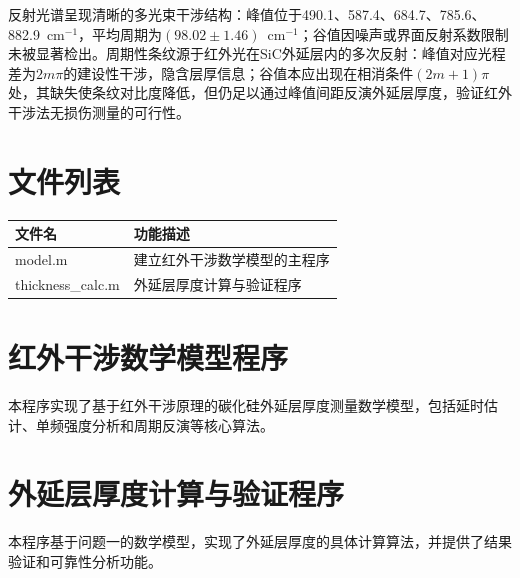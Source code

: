 \documentclass[withoutpreface,bwprint]{cumcmthesis}
\begin{document}
反射光谱呈现清晰的多光束干涉结构：峰值位于490.1、587.4、684.7、785.6、882.9~cm$^{-1}$，平均周期为$(98.02\pm 1.46)$~cm$^{-1}$；谷值因噪声或界面反射系数限制未被显著检出。周期性条纹源于红外光在SiC外延层内的多次反射：峰值对应光程差为$2m\pi$的建设性干涉，隐含层厚信息；谷值本应出现在相消条件$(2m+1)\pi$处，其缺失使条纹对比度降低，但仍足以通过峰值间距反演外延层厚度，验证红外干涉法无损伤测量的可行性。

\nocite{*}

\newpage
\begin{appendices}
\section{文件列表}
\begin{table}[H]
\centering
\begin{tabularx}{\textwidth}{LL}
\toprule
文件名   & 功能描述 \\
\midrule
model.m & 建立红外干涉数学模型的主程序 \\
thickness\_calc.m & 外延层厚度计算与验证程序 \\
\bottomrule
\end{tabularx}
\label{tab:文件列表}
\end{table}

\section{红外干涉数学模型程序}
\noindent 本程序实现了基于红外干涉原理的碳化硅外延层厚度测量数学模型，包括延时估计、单频强度分析和周期反演等核心算法。


\section{外延层厚度计算与验证程序}
\noindent 本程序基于问题一的数学模型，实现了外延层厚度的具体计算算法，并提供了结果验证和可靠性分析功能。

\end{appendices}
\end{document}
